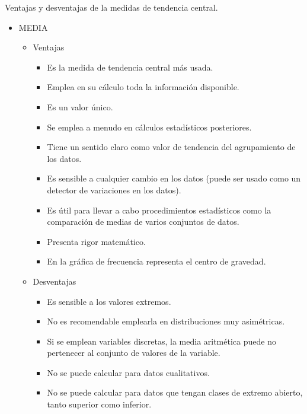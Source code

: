 \vspace{10mm}%
\begin{myalertblock}{Ventajas y desventajas de la medidas de tendencia central.}

\begin{itemize}

\item MEDIA

	\begin{itemize}
	\item Ventajas 
		\begin{itemize}
		\item Es la medida de tendencia central más usada.
		\item Emplea en su cálculo toda la información disponible.
		\item Es un valor único.
		\item Se emplea a menudo en cálculos estadísticos posteriores.
		\item Tiene un sentido claro como valor de tendencia del agrupamiento de los datos.
		\item Es sensible a cualquier cambio en los datos (puede ser usado como un detector de variaciones en los datos).
		\item Es útil para llevar a cabo procedimientos estadísticos como la comparación de medias de varios conjuntos de datos.
		\item Presenta rigor matemático.
		\item En la gráfica de frecuencia representa el centro de gravedad.
		\end{itemize}
	\item Desventajas
		\begin{itemize}
		\item Es sensible a los valores extremos.
		\item No es recomendable emplearla en distribuciones muy asimétricas.
		\item Si se emplean variables discretas, la media aritmética puede no pertenecer al conjunto de valores de la variable.
		\item No se puede calcular para datos cualitativos.
		\item No se puede calcular para datos que tengan clases de extremo abierto, tanto superior como inferior.
		\end{itemize}
	\end{itemize}


\end{itemize}
\end{myalertblock}
